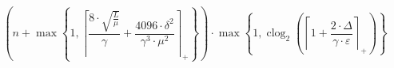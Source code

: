 \[\left(n + \max\left\{ 1, \left\lceil \frac{8 \cdot \sqrt{\frac{L}{\mu}}}{\gamma} + \frac{4096 \cdot \delta^{2}}{\gamma^{3} \cdot \mu^{2}} \right\rceil_{+} \right\}\right) \cdot \max\left\{ 1, \operatorname{clog}_{2}\left(\left\lceil 1 + \frac{2 \cdot \Delta}{\gamma \cdot \varepsilon} \right\rceil_{+}\right) \right\}\]
